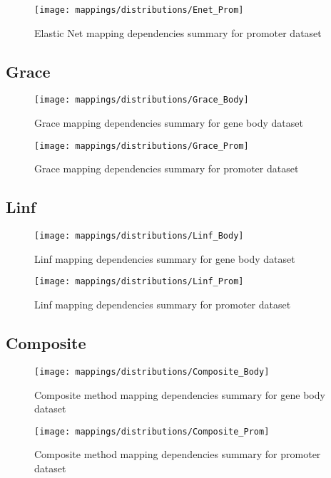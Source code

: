 \begin{figure}[H]
	\centering
	\texttt{[image: mappings/distributions/Enet\_Prom]}
	\caption{Elastic Net mapping dependencies summary for promoter dataset}
	\label{fig:map_prom_enet}
\end{figure}


\pagebreak
\subsection{Grace}

\begin{figure}[H]
	\centering
	\texttt{[image: mappings/distributions/Grace\_Body]}
	\caption{Grace mapping dependencies summary for gene body dataset}
	\label{fig:map_body_grace}
\end{figure}

\begin{figure}[H]
	\centering
	\texttt{[image: mappings/distributions/Grace\_Prom]}
	\caption{Grace mapping dependencies summary for promoter dataset}
	\label{fig:map_prom_grace}
\end{figure}


\pagebreak
\subsection{Linf}

\begin{figure}[H]
	\centering
	\texttt{[image: mappings/distributions/Linf\_Body]}
	\caption{Linf mapping dependencies summary for gene body dataset}
	\label{fig:map_body_linf}
\end{figure}

\begin{figure}[H]
	\centering
	\texttt{[image: mappings/distributions/Linf\_Prom]}
	\caption{Linf mapping dependencies summary for promoter dataset}
	\label{fig:map_prom_linf}
\end{figure}


\pagebreak
\subsection{Composite}

\begin{figure}[H]
	\centering
	\texttt{[image: mappings/distributions/Composite\_Body]}
	\caption{Composite method mapping dependencies summary for gene body dataset}
	\label{fig:map_body_comp}
\end{figure}

\begin{figure}[H]
	\centering
	\texttt{[image: mappings/distributions/Composite\_Prom]}
	\caption{Composite method mapping dependencies summary for promoter dataset}
	\label{fig:map_prom_comp}
\end{figure}